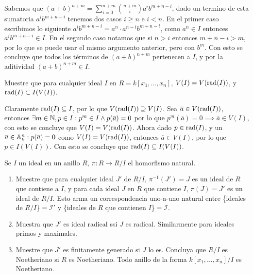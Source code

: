 \begin{sol}{1.18}
    Sabemos que $(a+b)^{n+m}=\sum_{i=0}^{n+m}\binom{n+m}{i}a^ib^{m+n-i}$, dado un termino de esta sumatoria $a^ib^{m+n-i}$ tenemos dos casos $i\geq n$ e $i<n$. En el primer caso escribimos lo siguiente $a^ib^{m+n-i}=a^n\cdot a^{n-i}b^{m+n-i}$, como $a^n\in I$ entonces $a^ib^{m+n-i}\in I$. En el segundo caso notamos que si $n>i$ entonces $m+n-i>m$, por lo que se puede usar el mismo argumento anterior, pero con $b^m$. Con esto se concluye que todos los términos de $(a+b)^{n+m}$ pertenecen a $I$, y por la aditividad $(a+b)^{n+m}\in I$.
\end{sol}

\begin{prob}{1.20}
    Muestre que para cualquier ideal $I$ en $R=k[x_1,...,x_n]$, $V(I)=V(\operatorname{rad}(I))$, y $\operatorname{rad}(I)\subset I(V(I))$.
\end{prob}

\begin{sol}{1.20}
    Claramente $\operatorname{rad}(I)\subseteq I$, por lo que $V(\operatorname{rad}(I))\supseteq V(I)$. Sea $\overline{a}\in V(\operatorname{rad}(I))$, entonces $\exists m\in\mathbb{N}, p\in I: p^m\in I\wedge p(\overline{a})=0$ por lo que $p^m(\overline{a})=0\implies \overline{a}\in V(I)$, con esto se concluye que $V(I)=V(\operatorname{rad}(I))$. Ahora dado $p\in\operatorname{rad}(I)$, y un $\overline{a}\in\mathbb{A}_k^n:p(\overline{a})=0$ como $V(I)=V(\operatorname{rad}(I))$, entonces $\overline{a}\in V(I)$, por lo que $p\in I(V(I))$. Con esto se concluye que $\operatorname{rad}(I)\subseteq I(V(I))$.
\end{sol}

\begin{prob}{1.22}
    Se $I$ un ideal en un anillo $R$, $\pi:R\rightarrow R/I$ el homorfismo natural.
    \begin{enumerate}[label=(\alph*)]
        \item Muestre que para cualquier ideal $J'$ de $R/I$, $\pi^{-1}(J')=J$ es un ideal de $R$ que contiene a $I$, y para cada ideal $J$ en $R$ que contiene $I$, $\pi(J)=J'$ es un ideal de $R/I$. Esto arma un correspondencia uno-a-uno natural entre \{ideales de $R/I$\}$=\mathcal{I}'$ y \{ideales de $R$ que contienen $I$\}$=\mathcal{I}$.
        \item Muestra que $J'$ es ideal radical ssi $J$ es radical. Similarmente para ideales primos y maximales.
        \item Muestre que $J'$ es finitamente generado si $J$ lo es. Concluya que $R/I$ es Noetheriano si $R$ es Noetheriano. Todo anillo de la forma $k[x_1,...,x_n]/I$ es Noetheriano.
    \end{enumerate}
\end{prob}

